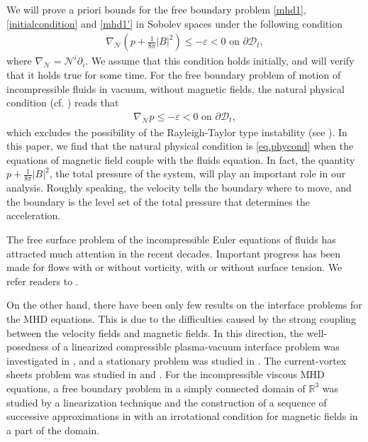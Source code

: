 \documentclass[12pt,reqno]{amsart}
\numberwithin{equation}{section}
\theoremstyle{definition}
\theoremstyle{remark}
\begin{document}
 We will prove a priori bounds for the  free boundary problem \eqref{mhd1}, \eqref{initialcondition} and \eqref{mhd1'} in Sobolev spaces under the following condition
\begin{align}\label{eq.phycond}
  {\nabla}_{\mathcal{N}} \left(p+\frac{1}{8\pi}|B|^2\right){\leqslant} -{\varepsilon}<0 \text{ on } {\partial}{{\mathscr{D}_t}},
\end{align}
where ${\nabla}_{\mathcal{N}}={\mathcal{N}}^i{\partial}_i$.
We  assume that this condition holds initially, and will verify that it holds true for some time. For the free boundary problem of motion of incompressible fluids in vacuum, without magnetic fields, the natural physical condition (cf. \cite{bealhou,CL00,Coutand,L1,L2,LN,Ebin,SZ,wu1, wu2,zhang}) reads that
\begin{align}\label{eq.phycond00}
  {\nabla}_{\mathcal{N}} p{\leqslant} -{\varepsilon}<0 \text{ on } {\partial}{{\mathscr{D}}}_t,
\end{align}
which excludes the possibility of the Rayleigh-Taylor type instability (see \cite{Ebin}). In this paper,  we
find that the natural physical condition is \eqref{eq.phycond} when the equations of magnetic field couple with the fluids equation. In fact, the quantity $p+\frac{1}{8\pi}|B|^2$,  the total pressure of the system, will play an important role in our analysis. Roughly speaking, the velocity tells the boundary where to move, and the boundary is the level set of the total pressure that determines the acceleration.

The free surface problem of the incompressible Euler equations of fluids has attracted much attention in the recent decades.  Important progress has been made for flows with or without vorticity, with or without surface tension. We refer readers to \cite{AM,CL00,Coutand,L1,L2,LN,Ebin,SZ,wu1,wu2,zhang}.

On the other hand, there have been only few results on the interface problems for the MHD equations. This is due to the difficulties caused by the strong coupling between
the velocity fields and magnetic fields. In this direction,  the well-posedness of a linearized compressible plasma-vacuum interface problem was investigated in \cite{tr1},  and a stationary problem was studied in \cite{FL95}. The current-vortex
sheets problem was studied in \cite{chenwang} and \cite{tr2}. For the incompressible viscous MHD equations, a free boundary problem  in a simply connected domain of ${\mathbb R}^3$ was studied by a linearization technique and the construction of a sequence of successive approximations in \cite{PS10} with an irrotational condition for magnetic fields in a part of the domain.
\end{document}
